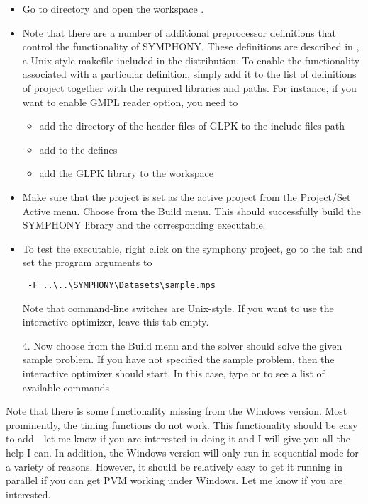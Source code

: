 \begin{itemize}

\item Go to  directory and open the workspace 
. 

\item Note that there are a number of additional preprocessor definitions that
control the functionality of SYMPHONY. These definitions are described in
, a Unix-style makefile included in the distribution. To 
enable the functionality associated with a particular definition, simply add 
it to the list of definitions of  project together with 
the required libraries and paths. For instance, if you 
want to enable GMPL reader option, you need to
\begin{itemize}
  \item add the directory of the header files of GLPK to the include 
files path
  \item add  to the defines
  \item add the GLPK library to the workspace
\end{itemize}
\item Make sure that the project  is set as the active 
project from the Project/Set Active menu. Choose 
 from the Build menu. This should successfully 
build the SYMPHONY library and the corresponding executable.

\item To test the executable, right click on the symphony project, go to the
 tab and set the program arguments to 
{\color{Brown}
\begin{verbatim}
 -F ..\..\SYMPHONY\Datasets\sample.mps 
\end{verbatim}
}
Note that command-line switches are Unix-style. If you want to use the 
interactive optimizer, leave this tab empty. 

4. Now choose  from the Build menu and the solver should 
solve the given sample problem. If you have not specified the sample problem, 
then the interactive optimizer should start. In this case, 
type  or  to see a list of available commands
\end{itemize}

Note that there is some functionality missing from the Windows version. Most
prominently, the timing functions do not work. This functionality
should be easy to add---let me know if you are interested in doing it and I
will give you all the help I can. In addition, the Windows version will only
run in sequential mode for a variety of reasons. However, it should be
relatively easy to get it running in parallel if you can get PVM working under
Windows. Let me know if you are interested.

